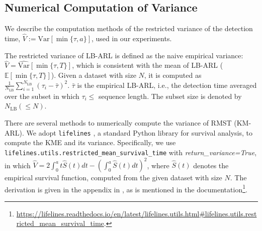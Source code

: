 \documentclass{article}
\theoremstyle{plain}
\theoremstyle{definition}
\theoremstyle{remark}
\begin{document}



\subsection{Numerical Computation of Variance} \label{app:Numerical Computation of Variance}
We describe the computation methods of the restricted variance of the detection time, $\hat{V} := \widehat{\mathrm{Var}} [ \min \{\tau, a\} ]$, used in our experiments.

The restricted variance of LB-ARL is defined as the naive empirical variance: $\hat{V} = \widehat{\mathrm{Var}} [ \min \{\tau, T \} ]$, which is consistent with the mean of LB-ARL ($\mathbb{E}[\min \{\tau, T \} ]$). Given a dataset with size $N$, it is computed as $\frac{1}{N_{\mathrm{LB}}} \sum_{i=1}^{N_{\mathrm{LB}}} (\tau_i - \bar{\tau})^2$. $\bar{\tau}$ is the empirical LB-ARL, i.e., the detection time averaged over the subset in which $\tau_i \leq$ sequence length. The subset size is denoted by $N_{\mathrm{LB}} (\leq N)$.

There are several methods to numerically compute the variance of RMST (KM-ARL). We adopt \texttt{lifelines} \citep{lifelines}, a standard Python library for survival analysis, to compute the KME and its variance.
Specifically, we use \texttt{lifelines.utils.restricted\_mean\_survival\_time} with \textit{return\_variance=True}, in which $\hat{V} = 2 \int_{0}^{a} t \hat{S}(t) d t - (\int_0^{a} \hat{S}(t) d t )^2$, where $\hat{S}(t)$ denotes the empirical survival function, computed from the given dataset with size $N$. The derivation is given in the appendix in \citep{royston2013restricted}, as is mentioned in the documentation\footnote{
    \url{https://lifelines.readthedocs.io/en/latest/lifelines.utils.html\#lifelines.utils.restricted\_mean\_survival\_time}.
}.
\end{document}
